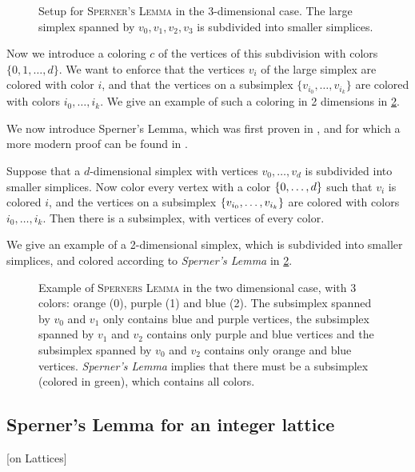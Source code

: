 \begin{figure}[ht]
    \centering
    \caption[Setup for \textsc{Sperner's Lemma}]{Setup for \textsc{Sperner's Lemma} in the 3-dimensional case. The large simplex spanned by $v_0, v_1, v_2, v_3$ is subdivided into smaller simplices.}
    \label{fig:sperner_setup_example}
\end{figure}

Now we introduce a coloring $c$ of the vertices of this subdivision with colors $\{0, 1, \dots, d\}$. We want to enforce that the vertices $v_i$ of the large simplex are colored with color $i$, and that the vertices on a subsimplex $\{v_{i_0}, \dots, v_{i_k}\}$ are colored with colors $i_0, \dots, i_k$. We give an example of such a coloring in 2 dimensions in \cref{fig:sperner_lemma_example}.

We now introduce Sperner's Lemma, which was first proven in , and for which a more modern proof can be found in .
\begin{theorem}
    Suppose that a $d$-dimensional simplex with vertices $v_0, \dots, v_d$ is subdivided into smaller simplices. Now color every vertex with a color $\left\{0, \dots, d\right\}$ such that $v_i$ is colored $i$, and the vertices on a subsimplex $\left\{v_{i_0}, \dots, v_{i_k}\right\}$ are colored with colors $i_0, \dots, i_k$. Then there is a subsimplex, with vertices of every color.
\end{theorem}

We give an example of a 2-dimensional simplex, which is subdivided into smaller simplices, and colored according to \textit{Sperner's Lemma} in \cref{fig:sperner_lemma_example}.

\begin{figure}[ht]
    \centering
    \caption[Example of \textsc{Sperners Lemma}]{Example of \textsc{Sperners Lemma} in the two dimensional case, with 3 colors: orange (0), purple (1) and blue (2). The subsimplex spanned by $v_0$ and $v_1$ only contains blue and purple vertices, the subsimplex spanned by $v_1$ and $v_2$ contains only purple and blue vertices and the subsimplex spanned by $v_0$ and $v_2$ contains only orange and blue vertices. \textit{Sperner's Lemma} implies that there must be a subsimplex (colored in green), which contains all colors.}
    \label{fig:sperner_lemma_example}
\end{figure}

\subsection{Sperner's Lemma for an integer lattice}[on Lattices]

